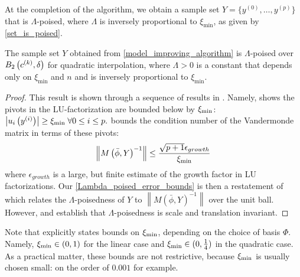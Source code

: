 
At the completion of the algorithm, we obtain a  sample set $Y=\{y^{(0)}, \ldots, y^{(p)}\}$ that is $\Lambda$-poised, 
where $\Lambda$ is inversely proportional to $\xi_{\min}$, as given by \cref{set_is_poised}.

\begin{theorem}
\label{set_is_poised}
The sample set $Y$ obtained from \cref{model_improving_algorithm} is $\Lambda$-poised over $B_2\left(c^{(k)}, \delta\right)$ for quadratic interpolation, 
where $\Lambda > 0$ is a constant that depends only on $\xi_{\text{min}}$ and $n$ and is inversely proportional to $\xi_{\text{min}}$.
\end{theorem}

\begin{proof}
This result is shown through a sequence of results in \cite{introduction_book}.
Namely,  \cite[Theorem 6.5]{introduction_book} shows the pivots in the LU-factorization are bounded below by $\xi_{\text{min}}$:
$
\left|u_i\left(y^{(i)}\right)\right| \ge \xi_{\text{min}} \; \forall 0 \le i \le p.
$
\cite[Section 6.7, Exercise 3]{introduction_book}
 bounds the condition number of the Vandermonde matrix in terms of these pivots:
\begin{align*}
\left\|M\left(\bar \phi, Y\right)^{-1}\right\| \le \frac{\sqrt{p+1}\epsilon_{growth}}{\xi_{\text{min}}}
\end{align*}
where $\epsilon_{growth}$ is a large, but finite estimate of the growth factor in LU factorizations.
Our \cref{Lambda_poised_error_bounds} is then a restatement of \cite[Theorem 3.14]{introduction_book} which 
relates the $\Lambda$-poisedness of $Y$ to $\left\|M\left(\bar \phi, Y\right)^{-1}\right\|$ over the unit ball.
However, \cite[Lemma 3.8]{introduction_book} and \cite[Lemma 3.9]{introduction_book} establish that $\Lambda$-poisedness is scale and translation invariant.
\end{proof}

Note that \cite[Theorem 6.5]{introduction_book} explicitly states bounds on $\xi_{\text{min}}$, depending on the choice of basis $\Phi$.
Namely, $\xi_{\text{min}} \in (0,1)$ for the linear case and $\xi_{\text{min}} \in (0, \frac 1 4)$ in the quadratic case.
As a practical matter, these bounds are not restrictive, because $\xi_{\text{min}}$ is usually chosen small: on the order of $0.001$ for example.


